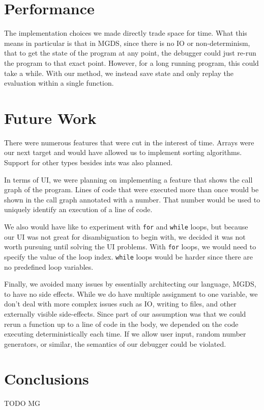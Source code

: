 \documentclass[letterpaper, 10pt]{article}
\newcommand{\ttt}{\texttt}
\begin{document}
\section{Performance}
The implementation choices we made directly trade space for time. What
this means in particular is that in MGDS, since there is no IO or
non-determinism, that to get the state of the program at any point, the
debugger could just re-run the program to that exact point. However, for a
long running program, this could take a while. With our method, we instead
save state and only replay the evaluation within a single function.

\section{Future Work}
There were numerous features that were cut in the interest of time. Arrays
were our next target and would have allowed us to implement sorting
algorithms. Support for other types besides ints was also planned.

In terms of UI, we were planning on implementing a feature that shows the
call graph of the program. Lines of code that were executed more than once
would be shown in the call graph annotated with a number. That number
would be used to uniquely identify an execution of a line of code.

We also would have like to experiment with \ttt{for} and \ttt{while}
loops, but because our UI was not great for disambiguation to begin with,
we decided it was not worth pursuing until solving the UI problems. With
\ttt{for} loops, we would need to specify the value of the loop
index. \ttt{while} loops would be harder since there are no predefined loop
variables. 

Finally, we avoided many issues by essentially architecting our language,
MGDS, to have no side effects. While we do have multiple assignment to one
variable, we don't deal with more complex issues such as IO, writing to
files, and other externally visible side-effects. Since part of our
assumption was that we could rerun a function up to a line of code in the
body, we depended on the code executing deterministically each time. If we
allow user input, random number generators, or similar, the semantics of
our debugger could be violated.

\section{Conclusions}
TODO MG
\end{document}
